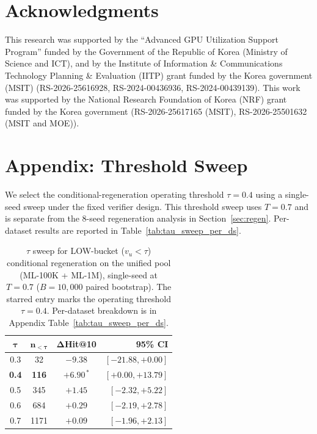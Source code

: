 \documentclass[11pt]{article}
\begin{document}
\section*{Acknowledgments}
This research was supported by the ``Advanced GPU Utilization Support Program'' funded by the Government of the Republic of Korea (Ministry of Science and ICT), and by the Institute of Information \& Communications Technology Planning \& Evaluation (IITP) grant funded by the Korea government (MSIT) (RS-2026-25616928, RS-2024-00436936, RS-2024-00439139). This work was supported by the National Research Foundation of Korea (NRF) grant funded by the Korea government (RS-2026-25617165 (MSIT), RS-2026-25501632 (MSIT and MOE)).




%


\appendix
\clearpage

\section{Appendix: Threshold Sweep}
\label{app:tau}


We select the conditional-regeneration operating threshold $\tau{=}0.4$ using a single-seed sweep under the fixed verifier design. This threshold sweep uses $T{=}0.7$ and is separate from the 8-seed regeneration analysis in Section~\ref{sec:regen}. Per-dataset results are reported in Table~\ref{tab:tau_sweep_per_ds}.

\begin{table}[h]
\centering
\small
\setlength{\tabcolsep}{10pt}
\begin{tabular}{cccr}
\toprule
$\boldsymbol{\tau}$ & $\mathbf{n_{<\tau}}$ & $\mathbf{\Delta}$Hit@10 & \textbf{95\% CI} \\
\midrule
0.3 &   32 & $-9.38$           & $[-21.88,+0.00]$ \\
\textbf{0.4} & \textbf{116} & $\mathbf{+6.90^{\,*}}$ & $\mathbf{[+0.00,+13.79]}$ \\
0.5 &  345 & $+1.45$           & $[-2.32,+5.22]$  \\
0.6 &  684 & $+0.29$           & $[-2.19,+2.78]$  \\
0.7 & 1171 & $+0.09$           & $[-1.96,+2.13]$  \\
\bottomrule
\end{tabular}
\caption{$\tau$ sweep for LOW-bucket ($v_u < \tau$) conditional regeneration on the unified pool (ML-100K + ML-1M), single-seed at $T{=}0.7$ ($B{=}10{,}000$ paired bootstrap). The starred entry marks the operating threshold $\tau{=}0.4$. Per-dataset breakdown is in Appendix Table~\ref{tab:tau_sweep_per_ds}.}
\label{tab:tau_sweep}
\end{table}
\end{document}
